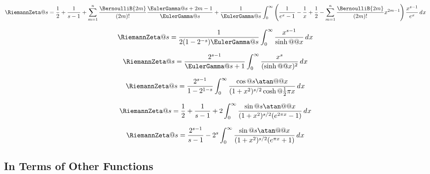 \documentclass{article}
\begin{document}
\begin{equation}\label{eq:ZE.INT.EL7}
  \RiemannZeta@{s}
  = \frac{1}{2} + \frac{1}{s-1}
  + \sum_{m=1}^n
        \frac{\BernoulliB{2m}}{(2m)!}
        \frac{\EulerGamma@{s+2m-1}}{\EulerGamma@{s}}
  + \frac{1}{\EulerGamma@{s}}
    \int_0^\infty
        \left( \frac{1}{\expe^x-1}
             - \frac{1}{x}
             + \frac{1}{2}
             - \sum_{m=1}^n \frac{\BernoulliB{2m}}{(2m)!} x^{2m-1}
        \right)
        \frac{x^{s-1}}{\expe^x}
    \diff{x}
\end{equation}

\begin{equation}\label{eq:ZE.INT.EL8}
  \RiemannZeta@{s}
  = \frac{1}{2 (1 - 2^{-s}) \EulerGamma@{s}}
    \int_0^\infty \frac{x^{s-1}}{\sinh@@{x}} \diff{x}
\end{equation}

\begin{equation}\label{eq:ZE.INT.EL9}
  \RiemannZeta@{s}
  = \frac{2^{s-1}}{\EulerGamma@{s+1}}
    \int_0^\infty \frac{x^s}{(\sinh@@{x})^2} \diff{x}
\end{equation}

\begin{equation}\label{eq:ZE.INT.EL10}
  \RiemannZeta@{s}
  = \frac{2^{s-1}}{1 - 2^{1-s}}
    \int_0^\infty
        \frac{\cos@{s \atan@@{x}}}{(1 + x^2)^{s/2} \cosh@{\frac{1}{2} \cpi x}}
    \diff{x}
\end{equation}

\begin{equation}\label{eq:ZE.INT.EL11}
  \RiemannZeta@{s}
  = \frac{1}{2}
  + \frac{1}{s-1}
  + 2 \int_0^\infty
          \frac{\sin@{s \atan@@{x}}}{(1 + x^2)^{s/2} (\expe^{2\cpi x} - 1)}
      \diff{x}
\end{equation}

\begin{equation}\label{eq:ZE.INT.EL12}
  \RiemannZeta@{s}
  = \frac{2^{s-1}}{s-1}
  - 2^s \int_0^\infty
            \frac{\sin@{s \atan@@{x}}}{(1 + x^2)^{s/2} (\expe^{\cpi x} + 1)}
        \diff{x}
\end{equation}

\subsection{In Terms of Other Functions}\label{sec:ZE.INT.ADV}%
\end{document}
